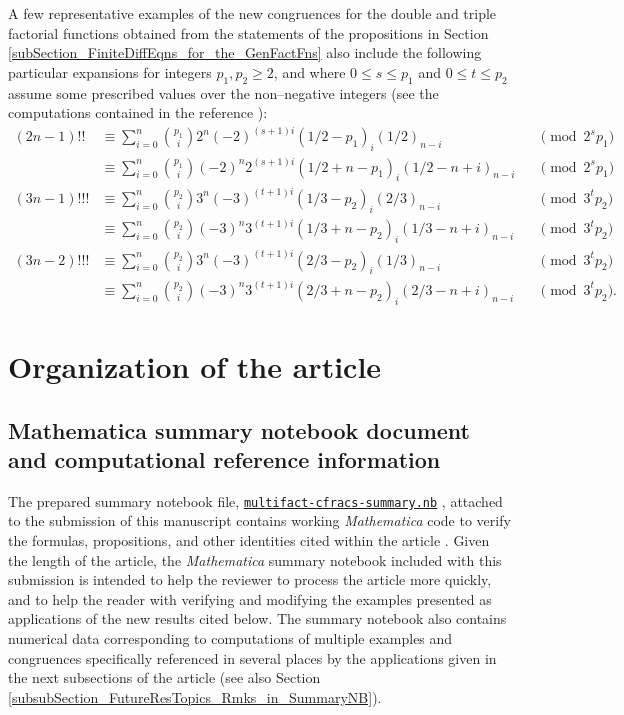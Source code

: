 \documentclass[12pt,reqno]{article}
\numberwithin{sfootnote}{section}
\numberwithin{equation}{section}
\theoremstyle{plain}
\theoremstyle{definition}
\theoremstyle{remark}
\newcommand{\TheSummaryNBFile}[0]{\texttt{multifact-cfracs-summary.nb}}
\newcommand{\TheSummaryNBFileGoogleDriveLink}[0]{https://drive.google.com/file/d/0B6na6iIT7ICZRFltbTVVcmVpVk0/view?usp=drivesdk}
\renewcommand{\TheSummaryNBFile}{ 
     \href{\TheSummaryNBFileGoogleDriveLink}{\texttt{multifact-cfracs-summary.nb}}%
}
\newcommand{\Mm}[0]{\emph{Mathematica}}
\newcommand{\Pochhammer}[2]{\ensuremath{\left(#1\right)_{#2}}}
\begin{document}
A few representative examples of the 
new congruences for the double and triple factorial 
functions obtained from the statements of the propositions in 
Section \ref{subSection_FiniteDiffEqns_for_the_GenFactFns} 
also include the following 
particular expansions for integers $p_1,p_2\geq 2$, and where 
$0 \leq s \leq p_1$ and $0 \leq t \leq p_2$ 
assume some prescribed values over the non--negative integers 
(see the computations contained in the reference \citep{SUMMARYNBREF-STUB}): 
\begin{align*} 
(2n-1)!! 
     & \equiv 
     \sum_{i=0}^{n} \binom{p_1}{i} 
     2^{n} (-2)^{(s+1)i} \Pochhammer{1/2-p_1}{i} \Pochhammer{1/2}{n-i} 
     && \pmod{2^{s} p_1} \\ 
     & \equiv 
     \sum_{i=0}^{n} \binom{p_1}{i} 
     (-2)^{n} 2^{(s+1)i} \Pochhammer{1/2+n-p_1}{i} 
     \Pochhammer{1/2-n+i}{n-i} 
     && \pmod{2^{s} p_1} \\ 
(3n-1)!!! 
     & \equiv 
     \sum_{i=0}^{n} \binom{p_2}{i} 
     3^{n} (-3)^{(t+1)i} \Pochhammer{1/3-p_2}{i} \Pochhammer{2/3}{n-i} 
     && \pmod{3^{t} p_2} \\ 
     & \equiv 
     \sum_{i=0}^{n} \binom{p_2}{i} 
     (-3)^{n} 3^{(t+1)i} \Pochhammer{1/3+n-p_2}{i} 
     \Pochhammer{1/3-n+i}{n-i} 
     && \pmod{3^{t} p_2} \\ 
(3n-2)!!! 
     & \equiv 
     \sum_{i=0}^{n} \binom{p_2}{i} 
     3^{n} (-3)^{(t+1)i} \Pochhammer{2/3-p_2}{i} \Pochhammer{1/3}{n-i} 
     && \pmod{3^{t} p_2} \\ 
     & \equiv 
     \sum_{i=0}^{n} \binom{p_2}{i} 
     (-3)^{n} 3^{(t+1)i} \Pochhammer{2/3+n-p_2}{i} 
     \Pochhammer{2/3-n+i}{n-i} 
     && \pmod{3^{t} p_2}. 
\end{align*} 

\section{Organization of the article} 

\subsection{Mathematica summary notebook document and 
            computational reference information} 
\label{subSection_MmSummaryNBInfo} 

The prepared summary notebook file, \TheSummaryNBFile, 
attached to the submission of this manuscript 
contains working \Mm{} code to verify the formulas, 
propositions, and other identities cited within the article 
\citep{SUMMARYNBREF-STUB}. 
Given the length of the article, 
the \Mm{} summary notebook included with this submission 
is intended to help the reviewer to process the 
article more quickly, and to help the reader with verifying and 
modifying the examples presented as 
applications of the new results cited below. 
The summary notebook also contains numerical data 
corresponding to computations of multiple examples and 
congruences specifically referenced in several places by the 
applications given in the next subsections of the article 
(see also Section \ref{subsubSection_FutureResTopics_Rmks_in_SummaryNB}). 
\end{document}
